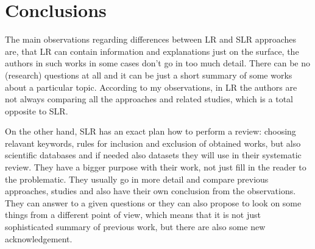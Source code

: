 \section*{Conclusions}\label{Conclusions}
The main observations regarding differences between LR and SLR approaches are, that LR can contain information and explanations just on the surface, the authors in such works in some cases don't go in too much detail. There can be no (research) questions at all and it can be just a short summary of some works about a particular topic. According to my observations, in LR the authors are not always comparing all the approaches and related studies, which is a total opposite to SLR. 

On the other hand, SLR has an exact plan how to perform a review: choosing relavant keywords, rules for inclusion and exclusion of obtained works, but also scientific databases and if needed also datasets they will use in their systematic review. They have a bigger purpose with their work, not just fill in the reader to the problematic. They usually go in more detail and compare previous approaches, studies and also have their own conclusion from the observations. They can answer to a given questions or they can also propose to look on some things from a different point of view, which means that it is not just sophisticated summary of previous work, but there are also some new acknowledgement.